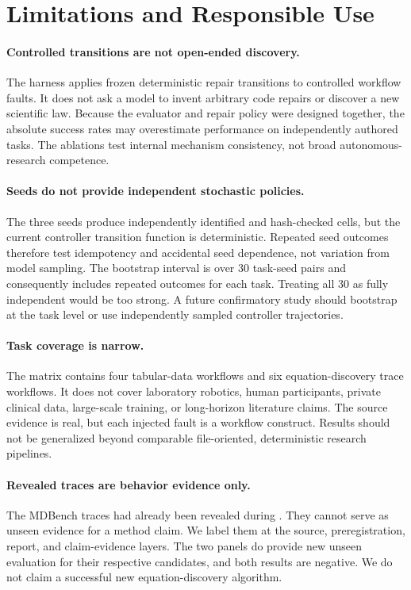 \section{Limitations and Responsible Use}

\paragraph{Controlled transitions are not open-ended discovery.}
The \routeb{} harness applies frozen deterministic repair transitions to
controlled workflow faults. It does not ask a model to invent arbitrary code
repairs or discover a new scientific law. Because the evaluator and repair
policy were designed together, the absolute success rates may overestimate
performance on independently authored tasks. The ablations test internal
mechanism consistency, not broad autonomous-research competence.

\paragraph{Seeds do not provide independent stochastic policies.}
The three seeds produce independently identified and hash-checked cells, but
the current controller transition function is deterministic. Repeated seed
outcomes therefore test idempotency and accidental seed dependence, not
variation from model sampling. The bootstrap interval is over 30 task-seed
pairs and consequently includes repeated outcomes for each task. Treating all
30 as fully independent would be too strong. A future confirmatory study
should bootstrap at the task level or use independently sampled controller
trajectories.

\paragraph{Task coverage is narrow.}
The matrix contains four tabular-data workflows and six equation-discovery
trace workflows. It does not cover laboratory robotics, human participants,
private clinical data, large-scale training, or long-horizon literature
claims. The source evidence is real, but each injected fault is a workflow
construct. Results should not be generalized beyond comparable
file-oriented, deterministic research pipelines.

\paragraph{Revealed traces are behavior evidence only.}
The MDBench traces had already been revealed during \routea{}. They cannot
serve as unseen evidence for a method claim. We label them at the source,
preregistration, report, and claim-evidence layers. The two \routea{} panels
do provide new unseen evaluation for their respective candidates, and both
results are negative. We do not claim a successful new equation-discovery
algorithm.

